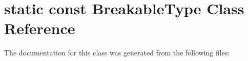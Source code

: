 \hypertarget{classstatic_01const_01BreakableType}{}\section{static const Breakable\+Type Class Reference}
\label{classstatic_01const_01BreakableType}


The documentation for this class was generated from the following files\+: